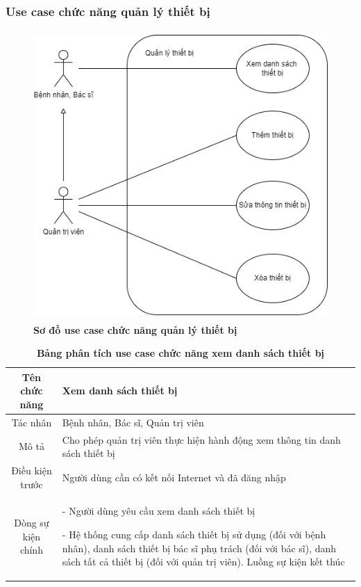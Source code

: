 \subsubsection{Use case chức năng quản lý thiết bị}
  \begin{figure}[H]
    \centering
    \includegraphics[width=12cm,height=11cm]{Images/use_case/use_case_manage_device.png}
    \caption[Sơ đồ use case chức năng quản lý thiết bị]{\bfseries \fontsize{12pt}{0pt}
    \selectfont Sơ đồ use case chức năng quản lý thiết bị}
    \label{use_case_device_management} %
  \end{figure}

  \begin{table}[H]
    \caption{\bfseries \fontsize{12pt}{0pt}\selectfont Bảng phân tích use case chức năng xem danh sách thiết bị}
    \centering
    \begin{tabularx}{0.9\textwidth}{|c|X|}
      \hline
      \textbf{Tên chức năng} & \textbf{Xem danh sách thiết bị} \\
      \hline
      Tác nhân & Bệnh nhân, Bác sĩ, Quản trị viên \\
      \hline
      Mô tả & Cho phép quản trị viên thực hiện hành động xem thông tin danh sách thiết bị \\
      \hline
      Điều kiện trước & Người dùng cần có kết nối Internet và đã đăng nhập \\
      \hline
      Dòng sự kiện chính & 
        - Người dùng yêu cầu xem danh sách thiết bị
        
        - Hệ thống cung cấp danh sách thiết bị sử dụng (đối với bệnh nhân), danh sách thiết bị bác sĩ phụ trách (đối với bác sĩ), 
        danh sách tất cả thiết bị (đối với quản trị viên). Luồng sự kiện kết thúc 
        \\
      \hline
    \end{tabularx}
  \end{table}

